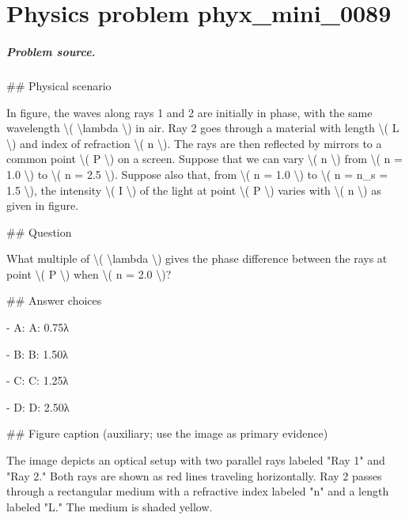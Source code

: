 
\chapter{Physics problem phyx\_mini\_0089}
\label{ch:PhyXMiniProblems_problem_phyx_mini_0089}

\paragraph{Problem source.}
\#\# Physical scenario

In figure, the waves along rays 1 and 2 are initially in phase, with the same wavelength \textbackslash{}( \textbackslash{}lambda \textbackslash{}) in air. Ray 2 goes through a material with length \textbackslash{}( L \textbackslash{}) and index of refraction \textbackslash{}( n \textbackslash{}). The rays are then reflected by mirrors to a common point \textbackslash{}( P \textbackslash{}) on a screen. Suppose that we can vary \textbackslash{}( n \textbackslash{}) from \textbackslash{}( n = 1.0 \textbackslash{}) to \textbackslash{}( n = 2.5 \textbackslash{}). Suppose also that, from \textbackslash{}( n = 1.0 \textbackslash{}) to \textbackslash{}( n = n\_s = 1.5 \textbackslash{}), the intensity \textbackslash{}( I \textbackslash{}) of the light at point \textbackslash{}( P \textbackslash{}) varies with \textbackslash{}( n \textbackslash{}) as given in figure.

\#\# Question

What multiple of \textbackslash{}( \textbackslash{}lambda \textbackslash{}) gives the phase difference between the rays at point \textbackslash{}( P \textbackslash{}) when \textbackslash{}( n = 2.0 \textbackslash{})?

\#\# Answer choices

- A: A: 0.75λ

- B: B: 1.50λ

- C: C: 1.25λ

- D: D: 2.50λ

\#\# Figure caption (auxiliary; use the image as primary evidence)

The image depicts an optical setup with two parallel rays labeled "Ray 1" and "Ray 2." Both rays are shown as red lines traveling horizontally. Ray 2 passes through a rectangular medium with a refractive index labeled "n" and a length labeled "L." The medium is shaded yellow.

